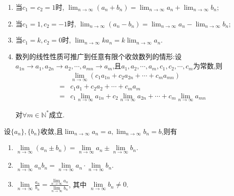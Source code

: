 \begin{enumerate}
    \item 当$c_1=c_2=1$时, $\lim_{n \to \infty} (a_n+b_n)=\lim_{n \to \infty} a_n+\lim_{n \to \infty} b_n$;
    \item 当$c_1=1,c_2=-1$时, $\lim_{n \to \infty} (a_n-b_n)=\lim_{n \to \infty} a_n-\lim_{n \to \infty} b_n$;
    \item 当$c_1=k,c_2=0$时, $\lim_{n \to \infty} ka_n=k\lim_{n \to \infty} a_n$.
    \item 数列的线性性质可推广到任意有限个收敛数列的情形:设$a_{1n} \rightarrow a_1, a_{2n} \rightarrow a_2, \cdots, a_{mn} \rightarrow a_m$,且$a_1,a_2,\cdots,a_m,c_1,c_2,\cdots,c_m$为常数,则
          \begin{align*}
                & \lim_{n \to \infty}(c_1a_{1n}+c_2a_{2n}+\cdots+c_ma_{mn})                                        \\
              = & c_1a_1+c_2a_2+\cdots+c_ma_m                                                                      \\
              = & c_1\lim_{n \to \infty} a_{1n}+c_2\lim_{n \to \infty} a_{2n}+\cdots+c_m\lim_{n \to \infty} a_{mn}
          \end{align*}

          对$\forall m\in \mathbb{N}^*$成立.
\end{enumerate}

\begin{theorem}[收敛数列极限的四则运算法则]\label{thm:sequence_limit_four_properties}
    设$\{a_n\},\{b_n\}$收敛,且$\lim_{n \to \infty} a_n = a, \lim_{n \to \infty} b_n = b$,则有

    \begin{enumerate}
        \item $\lim\limits_{n \to \infty} (a_n \pm b_n) = \lim\limits_{n \to \infty} a_n \pm \lim\limits_{n \to \infty} b_n$.
        \item $\lim\limits_{n \to \infty} a_n b_n = \lim\limits_{n \to \infty} a_n \cdot \lim\limits_{n \to \infty} b_n$.
        \item $\lim\limits_{n \to \infty} \displaystyle \frac{a_n}{b_n} = \displaystyle \frac{\lim\limits_{n \to \infty} a_n}{\lim\limits_{n \to \infty} b_n}$, 其中 $\lim\limits_{n \to \infty} b_n \neq 0$.
    \end{enumerate}

\end{theorem}

